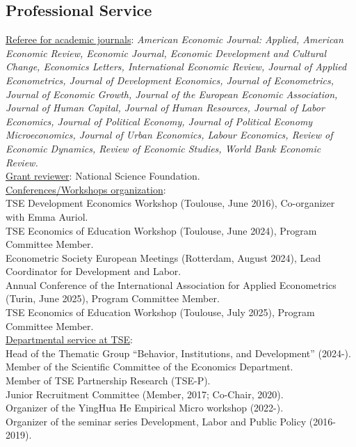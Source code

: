 \documentclass[12pt,english]{article}
\begin{document}
\subsection*{Professional Service}

\noindent \underline{Referee for academic journals}: \textit{American Economic Journal: Applied, American Economic Review, Economic Journal, Economic Development and Cultural Change, Economics Letters, International Economic Review, Journal of Applied Econometrics, Journal of Development Economics, Journal of Econometrics, Journal of Economic Growth, Journal of the European Economic Association, Journal of Human Capital, Journal of Human Resources, Journal of Labor Economics, Journal of Political Economy,  Journal of Political Economy Microeconomics, Journal of Urban Economics, Labour Economics, Review of Economic Dynamics, Review of Economic Studies, World Bank Economic Review.} \\

\noindent \underline{Grant reviewer}: National Science Foundation. \\

\noindent \underline{Conferences/Workshops organization}:\\
TSE Development Economics Workshop (Toulouse, June 2016), Co-organizer with Emma Auriol.\vspace{0.2cm} \\
TSE Economics of Education Workshop (Toulouse, June 2024), Program Committee Member. \vspace{0.2cm} \\
Econometric Society European Meetings (Rotterdam, August 2024), Lead Coordinator for Development and Labor.\vspace{0.2cm}\\
Annual Conference of the International Association for Applied Econometrics (Turin, June 2025), Program Committee Member.\vspace{0.2cm}\\
TSE Economics of Education Workshop (Toulouse, July 2025), Program Committee Member.\\


\noindent \underline{Departmental service at TSE}: \\
Head of the Thematic Group ``Behavior, Institutions, and Development'' (2024-).\vspace{0.2cm}\\
Member of the Scientific Committee of the Economics Department.\vspace{0.2cm}\\
Member of TSE Partnership Research (TSE-P). \vspace{0.2cm}\\
Junior Recruitment Committee (Member, 2017; Co-Chair, 2020).\vspace{0.2cm}\\
Organizer of the YingHua He Empirical Micro workshop (2022-).\vspace{0.2cm}\\
Organizer of the seminar series Development, Labor and Public Policy (2016-2019).
\end{document}
